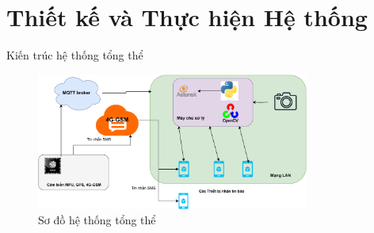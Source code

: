 \section{Thiết kế và Thực hiện Hệ thống}

\begin{frame}{Kiến trúc hệ thống tổng thể}
    \begin{figure}
        \centering
        \includegraphics[width=0.8\textwidth]{images/resuilt_structure_diagram.pdf}
        \caption{Sơ đồ hệ thống tổng thể}
    \end{figure}
\end{frame}

